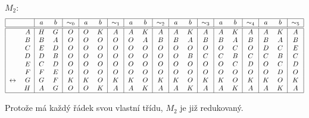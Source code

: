 $M_2$:
\[
\begin{tabular}{|r r|c c|c|c c|c|c c|c|c c|c|c c|c|c c|c|}
    \hline
    & & $a$ & $b$ & $\sim_0$ & $a$ & $b$ & $\sim_1$ & $a$ & $b$ & $\sim_2$ & $a$ & $b$ & $\sim_3$ & $a$ & $b$ & $\sim_4$ & $a$ & $b$ & $\sim_5$\\
    \hline
    \hline
                     & $A$ &$H$ &$G$ &$O$ &$O$ &$K$ &$A$ &$A$ &$K$ &$A$ &$A$ &$K$ &$A$ &$A$ &$K$ &$A$ &$A$ &$K$ &$A$\\
                     & $B$ &$B$ &$A$ &$O$ &$O$ &$O$ &$O$ &$O$ &$A$ &$B$ &$B$ &$A$ &$B$ &$B$ &$A$ &$B$ &$B$ &$A$ &$B$\\
                     & $C$ &$E$ &$D$ &$O$ &$O$ &$O$ &$O$ &$O$ &$O$ &$O$ &$O$ &$O$ &$O$ &$O$ &$C$ &$O$ &$D$ &$C$ &$E$\\
                     & $D$ &$D$ &$B$ &$O$ &$O$ &$O$ &$O$ &$O$ &$O$ &$O$ &$O$ &$B$ &$C$ &$C$ &$B$ &$C$ &$C$ &$B$ &$C$\\
                     & $E$ &$C$ &$D$ &$O$ &$O$ &$O$ &$O$ &$O$ &$O$ &$O$ &$O$ &$O$ &$O$ &$O$ &$C$ &$D$ &$O$ &$C$ &$D$\\
                     & $F$ &$F$ &$E$ &$O$ &$O$ &$O$ &$O$ &$O$ &$O$ &$O$ &$O$ &$O$ &$O$ &$O$ &$O$ &$O$ &$O$ &$D$ &$O$\\
    $\leftrightarrow$& $G$ &$G$ &$F$ &$K$ &$K$ &$O$ &$K$ &$K$ &$O$ &$K$ &$K$ &$O$ &$K$ &$K$ &$O$ &$K$ &$K$ &$O$ &$K$\\
                     & $H$ &$A$ &$G$ &$O$ &$O$ &$K$ &$A$ &$A$ &$K$ &$A$ &$A$ &$K$ &$A$ &$A$ &$K$ &$A$ &$A$ &$K$ &$A$\\
    \hline
\end{tabular}
\]

Protože má každý řádek svou vlastní třídu, $M_2$ je již redukovaný.

